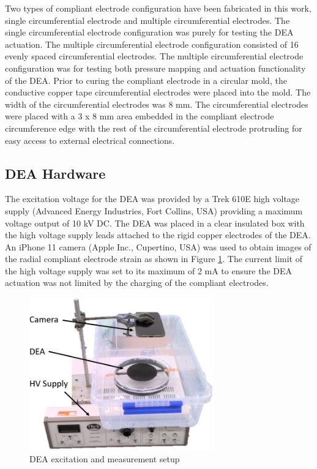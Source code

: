 	Two types of compliant electrode configuration have been fabricated in this work, single circumferential electrode and multiple circumferential electrodes. The single circumferential electrode configuration was purely for testing the DEA actuation. The multiple circumferential electrode configuration consisted of 16 evenly spaced circumferential electrodes. The multiple circumferential electrode configuration was for testing both pressure mapping and actuation functionality of the DEA. Prior to curing the compliant electrode in a circular mold, the conductive copper tape circumferential electrodes were placed into the mold. The width of the circumferential electrodes was 8 mm. The circumferential electrodes were placed with a 3 x 8 mm area embedded in the compliant electrode circumference edge with the rest of the circumferential electrode protruding for easy access to external electrical connections.
	
	
	\subsection{DEA Hardware}
	\label{subsec:dea_hw}
	The excitation voltage for the DEA was provided by a Trek 610E high voltage supply (Advanced Energy Industries, Fort Collins, USA) providing a maximum voltage output of 10 kV DC. The DEA was placed in a clear insulated box with the high voltage supply leads attached to the rigid copper electrodes of the DEA. An iPhone 11 camera (Apple Inc., Cupertino, USA) was used to obtain images of the radial compliant electrode strain as shown in Figure \ref{fig:HV_DEA_setup}. The current limit of the high voltage supply was set to its maximum of 2 mA to ensure the DEA actuation was not limited by the charging of the compliant electrodes.
	\begin{figure}[H]
		\centering
		\includegraphics[width=8cm]{Figures/HV_DEA_setup_labelled.jpg}
        \vspace{0.2cm}
		\caption{DEA excitation and measurement setup}
		\label{fig:HV_DEA_setup}
	\end{figure}
	
